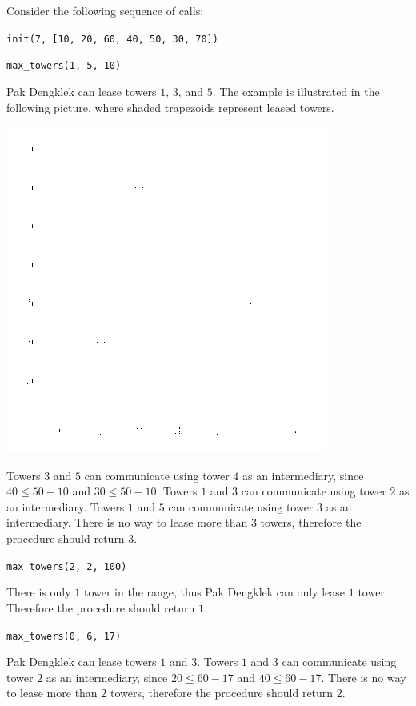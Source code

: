 Consider the following sequence of calls:

\texttt{init(7, [10, 20, 60, 40, 50, 30, 70])}


\texttt{max\_towers(1, 5, 10)}

Pak Dengklek can lease towers $1$, $3$, and $5$.
The example is illustrated in the following picture, where shaded trapezoids represent leased towers.

\includegraphics{towers-example.png}

Towers $3$ and $5$ can communicate using tower $4$ as an intermediary, since $40 \le 50 - 10$ and $30 \le 50 - 10$.
Towers $1$ and $3$ can communicate using tower $2$ as an intermediary.
Towers $1$ and $5$ can communicate using tower $3$ as an intermediary.
There is no way to lease more than $3$ towers, therefore the procedure should return $3$.

\texttt{max_towers(2, 2, 100)}

There is only $1$ tower in the range, thus Pak Dengklek can only lease $1$ tower.
Therefore the procedure should return $1$.

\texttt{max\_towers(0, 6, 17)}  

Pak Dengklek can lease towers $1$ and $3$.
Towers $1$ and $3$ can communicate using tower $2$ as an intermediary, since $20 \le 60 - 17$ and $40 \le 60 - 17$.
There is no way to lease more than $2$ towers, therefore the procedure should return $2$.

